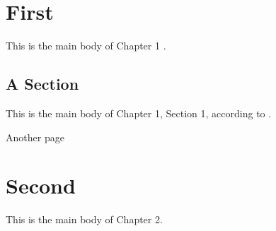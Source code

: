 \chapter{First}
This is the main body of Chapter 1 \citep{Turing:Mind1950}.

\section{A Section}
This is the main body of Chapter 1, Section 1, according to \citet{Godel:1940}.

\newpage


Another page



\chapter{Second}
This is the main body of Chapter 2.


